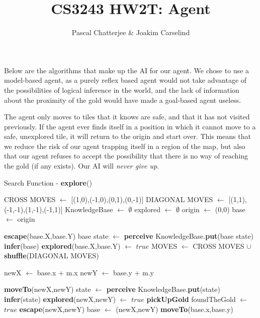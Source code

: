 \documentclass[11pt,a4paper]{article}
\author{Pascal Chatterjee & Joakim Carselind}
\title{CS3243 HW2T: Agent}
\begin{document}
 

Below are the algorithms that make up the AI for our agent. We chose to use a model-based agent, as a purely reflex based agent would not take advantage of the possibilities of logical inference in the world, and the lack of information about the proximity of the gold would have made a goal-based agent useless.

The agent only moves to tiles that it knows are safe, and that it has not visited previously. If the agent ever finds itself in a position in which it cannot move to a safe, unexplored tile, it will return to the origin and start over. This means that we reduce the risk of our agent trapping itself in a region of the map, but also that our agent refuses to accept the possibility that there is no way of reaching the gold (if any exists). Our AI will \textit{never give up}.  

\listofalgorithms 

\begin{algorithm}
\caption{Search Function - \textbf{explore}()}
\label{explore}
\begin{algorithmic}[1]
\REQUIRE CROSS MOVES $\leftarrow$ [(1,0),(-1,0),(0,1),(0,-1)]
\REQUIRE DIAGONAL MOVES $\leftarrow$ [(1,1),(-1,-1),(1,-1),(-1,1)]
\STATE KnowledgeBase $\leftarrow$ $\emptyset$
\STATE explored $\leftarrow$ $\emptyset$
\STATE origin $\leftarrow$ (0,0)
\STATE base $\leftarrow$ origin

\LOOP
{}
\STATE \textbf{escape}(base.X,base.Y)
\ELSE 
\STATE base state $\leftarrow$ \textbf{perceive}
\STATE KnowledgeBase.\textbf{put}(base state)
\STATE \textbf{infer}(base)
\STATE \textbf{explored}(base.X,base.Y) $\leftarrow$ $true$
\STATE 
\STATE MOVES $\leftarrow$ CROSS MOVES $\cup$ \textbf{shuffle}(DIAGONAL MOVES)

\STATE newX $\leftarrow$ base.x $+$ m.x 
\STATE newY $\leftarrow$ base.y $+$ m.y

\STATE \textbf{moveTo}(newX,newY)
\STATE state $\leftarrow$ \textbf{perceive}
\STATE KnowledgeBase.\textbf{put}(state)
\STATE \textbf{infer}(state)
\STATE \textbf{explored}(newX,newY) $\leftarrow$ $true$
\STATE \textbf{pickUpGold}
\STATE foundTheGold $\leftarrow$ $true$
\STATE \textbf{escape}(newX,newY)
\ENDIF
{}
\STATE base $\leftarrow$ (newX,newY)
\ELSE
\STATE \textbf{moveTo}(base.x,base.y)
\ENDIF
\ENDIF

\ENDFOR
\ENDIF
\ENDLOOP
\end{algorithmic}
\end{algorithm}
\end{document}
